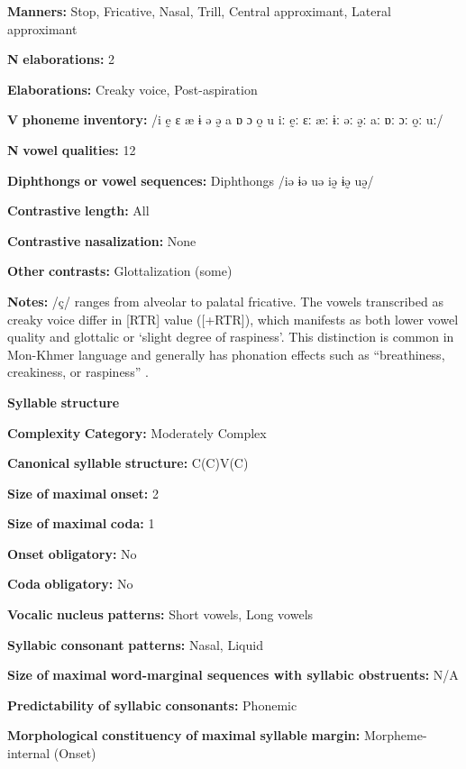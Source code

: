 \begin{styleBody}
\textbf{Manners:} Stop, Fricative, Nasal, Trill, Central approximant, Lateral approximant

\textbf{N} \textbf{elaborations:} 2

\textbf{Elaborations:} Creaky voice, Post-aspiration

\textbf{V} \textbf{phoneme} \textbf{inventory:} /i ḛ ɛ æ ɨ ə ə̰ a ɒ ɔ o̰ u iː ḛː ɛː æː ɨː əː ə̰ː aː ɒː ɔː o̰ː uː/

\textbf{N} \textbf{vowel} \textbf{qualities:} 12

\textbf{Diphthongs} \textbf{or} \textbf{vowel} \textbf{sequences:} Diphthongs /iə ɨə uə iə̰ ɨə̰ uə̰/

\textbf{Contrastive} \textbf{length:} All

\textbf{Contrastive} \textbf{nasalization:} None

\textbf{Other} \textbf{contrasts:} Glottalization (some)

\textbf{Notes:} /ç/ ranges from alveolar to palatal fricative. The vowels transcribed as creaky voice differ in [RTR] value ([+RTR]), which manifests as both lower vowel quality and glottalic or ‘slight degree of raspiness’. This distinction is common in Mon-Khmer language and generally has phonation effects such as “breathiness, creakiness, or raspiness” \citep[14]{Alves2006}.

\textbf{Syllable} \textbf{structure}

\textbf{Complexity} \textbf{Category:} Moderately Complex

\textbf{Canonical} \textbf{syllable} \textbf{structure:} C(C)V(C) \citep[17-21]{Alves2006}

\textbf{Size} \textbf{of} \textbf{maximal} \textbf{onset:} 2

\textbf{Size} \textbf{of} \textbf{maximal} \textbf{coda:} 1

\textbf{Onset} \textbf{obligatory:} No

\textbf{Coda} \textbf{obligatory:} No

\textbf{Vocalic} \textbf{nucleus} \textbf{patterns:} Short vowels, Long vowels

\textbf{Syllabic} \textbf{consonant} \textbf{patterns:} Nasal, Liquid

\textbf{Size} \textbf{of} \textbf{maximal} \textbf{word{}-marginal sequences with syllabic obstruents:} N/A

\textbf{Predictability} \textbf{of} \textbf{syllabic} \textbf{consonants:} Phonemic

\textbf{Morphological} \textbf{constituency} \textbf{of} \textbf{maximal} \textbf{syllable} \textbf{margin:} Morpheme-internal (Onset)


\end{styleBody}
